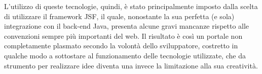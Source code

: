 L'utilizzo di queste tecnologie, quindi, è stato principalmente imposto dalla scelta di utilizzare il framework JSF, il quale, nonostante la sua perfetta (e sola) integrazione con il back-end Java, presenta alcune gravi mancanze rispetto alle convenzioni sempre più importanti del web. Il risultato è così un portale non completamente plasmato secondo la volontà dello sviluppatore, costretto in qualche modo a sottostare al funzionamento delle tecnologie utilizzate, che da strumento per realizzare idee diventa una invece la limitazione alla sua creatività.